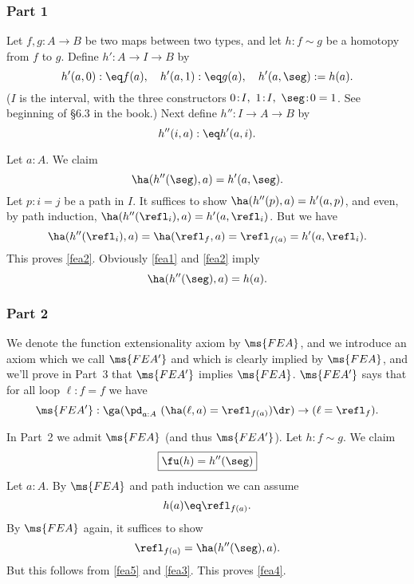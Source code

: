 \documentclass[12pt]{article}
\begin{document}
\subsubsection{Part 1}

Let $f,g:A\to B$ be two maps between two types, and let $h:f\sim g$ be a homotopy from $f$ to $g$. Define $h':A\to I\to B$ by
\begin{equation}\label{fea1}
h'(a,0):\eq f(a),\quad h'(a, 1):\eq g(a),\quad h'(a,\seg):=h(a).
\end{equation} 
($I$ is the interval, with the three constructors $0\!:\!I,\ 1\!:\!I,\ \seg\!:\!0=1$. 
See beginning of \S6.3 in the book.) Next define $h'':I\to A\to B$ by 
$$
h''(i,a):\eq h'(a,i).
$$ 

Let $a:A$. We claim 
\begin{equation}\label{fea2}
\ha(h''(\seg),a)=h'(a,\seg).
\end{equation} 
Let $p:i=j$ be a path in $I$. It suffices to show $\ha(h''(p),a)=h'(a,p)$, and even, by path induction, $\ha(h''(\refl_i),a)=h'(a,\refl_i)$. But we have 
$$
\ha(h''(\refl_i),a)=\ha(\refl_f,a)=\refl_{f(a)}=h'(a,\refl_i).
$$ 
This proves \eqref{fea2}. Obviously \eqref{fea1} and \eqref{fea2} imply 
\begin{equation}\label{fea3}
\ha(h''(\seg),a)=h(a).
\end{equation} 

\subsubsection{Part 2}

We denote the function extensionality axiom by $\ms{FEA}$, and we introduce an axiom which we call $\ms{FEA'}$ and which is clearly implied by $\ms{FEA}$, and we'll prove in Part~3 that $\ms{FEA'}$ implies $\ms{FEA}$. $\ms{FEA'}$ says that for all loop $\ell:f=f$ we have 
\begin{equation}\label{fea'}
\ms{FEA'}:\ga(\pd_{a:A}\ (\ha(\ell,a)=\refl_{f(a)})\dr)\to(\ell=\refl_f).
\end{equation}

In Part~2 we admit $\ms{FEA}$ (and thus $\ms{FEA'}$). Let $h:f\sim g$. We claim 
\begin{equation}\label{fea4}
\boxed{\fu(h)=h''(\seg)}
\end{equation} 
Let $a:A$. By $\ms{FEA}$ and path induction we can assume 
\begin{equation}\label{fea5}
h(a)\eq\refl_{f(a)}.
\end{equation} 
By $\ms{FEA}$ again, it suffices to show 
$$
\refl_{f(a)}=\ha(h''(\seg),a).
$$ 
But this follows from \eqref{fea5} and \eqref{fea3}. This proves \eqref{fea4}. 
\end{document}
